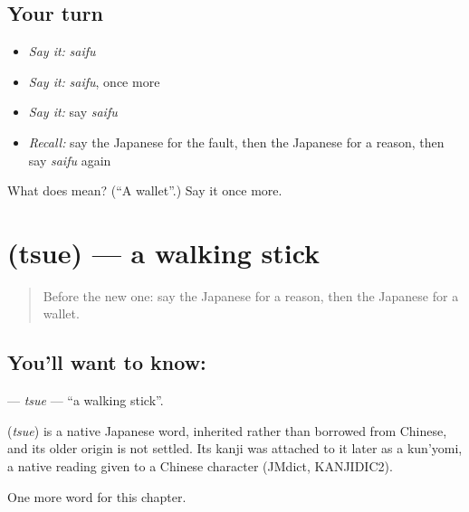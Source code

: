 \subsection*{Your turn}
\begin{itemize}
\raggedright
  \item \emph{Say it:} \emph{saifu}
  \item \emph{Say it:} \emph{saifu}, once more
  \item \emph{Say it:} say \emph{saifu}
  \item \emph{Recall:} say the Japanese for the fault, then the Japanese for a reason, then say \emph{saifu} again
\end{itemize}

\begin{tcolorbox}[breakable,colback=teal!4,colframe=teal!35!black,title={Before you move on}]
What does  mean? (\textquotedblleft{}A wallet\textquotedblright{}.) Say it once more.
\end{tcolorbox}
\section[\texorpdfstring{\ja{つえ} (tsue)}{つえ (tsue)}]{ (tsue) — a walking stick}

\label{lesson:JA-C99-tsue}



\begin{quote}
Before the new one: say the Japanese for a reason, then the Japanese for a wallet.
\end{quote}

\subsection*{You'll want to know: }
\textbf{} — \emph{tsue} — \textquotedblleft{}a walking stick\textquotedblright{}.

\begin{cousinweb}
\textbf{} (\emph{tsue}) is a native Japanese word, inherited rather than borrowed from Chinese, and its older origin is not settled. Its kanji was attached to it later as a kun'yomi, a native reading given to a Chinese character (JMdict, KANJIDIC2).
\end{cousinweb}

\begin{grammarlens}[title={What you've built}]
One more word for this chapter.
\end{grammarlens}

